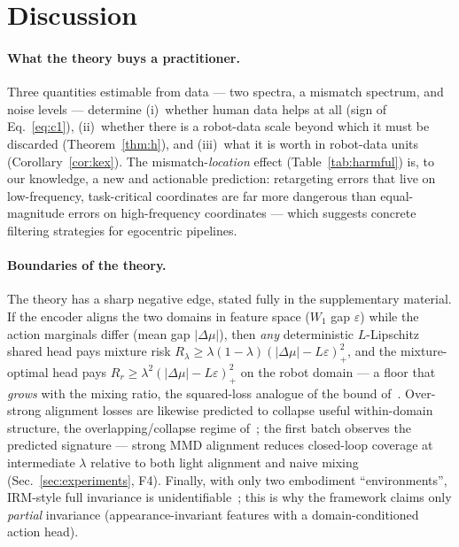\section{Discussion}
\label{sec:discussion}

\paragraph{What the theory buys a practitioner.}
Three quantities estimable from data --- two spectra, a mismatch spectrum, and noise levels --- determine (i)~whether human data helps at all (sign of Eq.~\eqref{eq:c1}), (ii)~whether there is a robot-data scale beyond which it must be discarded (Theorem~\ref{thm:h}), and (iii)~what it is worth in robot-data units (Corollary~\ref{cor:kex}).
The mismatch-\emph{location} effect (Table~\ref{tab:harmful}) is, to our knowledge, a new and actionable prediction: retargeting errors that live on low-frequency, task-critical coordinates are far more dangerous than equal-magnitude errors on high-frequency coordinates --- which suggests concrete filtering strategies for egocentric pipelines.

\paragraph{Boundaries of the theory.}
The theory has a sharp negative edge, stated fully in the supplementary material.
If the encoder aligns the two domains in feature space ($W_1$ gap $\varepsilon$) while the action marginals differ (mean gap $|\Delta\mu|$), then \emph{any} deterministic $L$-Lipschitz shared head pays mixture risk $R_\lambda \ge \lambda(1-\lambda)(|\Delta\mu| - L\varepsilon)_+^2$, and the mixture-optimal head pays $R_r \ge \lambda^2(|\Delta\mu| - L\varepsilon)_+^2$ on the robot domain --- a floor that \emph{grows} with the mixing ratio, the squared-loss analogue of the bound of~\cite{zhao2019learning}.
Over-strong alignment losses are likewise predicted to collapse useful within-domain structure, the overlapping/collapse regime of~\cite{lei2026simreal}; the first batch observes the predicted signature --- strong MMD alignment reduces closed-loop coverage at intermediate $\lambda$ relative to both light alignment and naive mixing (Sec.~\ref{sec:experiments}, F4).
Finally, with only two embodiment ``environments'', IRM-style full invariance is unidentifiable~\cite{arjovsky2019invariant}; this is why the framework claims only \emph{partial} invariance (appearance-invariant features with a domain-conditioned action head).

